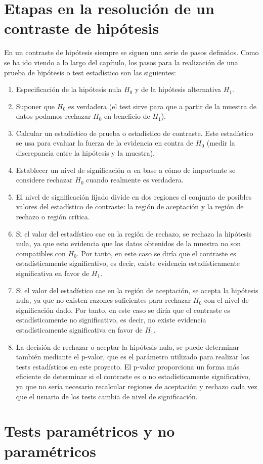\section{Etapas en la resolución de un contraste de hipótesis}
En un contraste de hipótesis siempre se siguen una serie de pasos definidos. Como se ha ido viendo a lo largo
del capítulo, los pasos para la realización de una prueba de hipótesis o test estadístico son las siguientes:
\begin{enumerate}
\item Especificación de la hipótesis nula $H_0$ y de la hipótesis alternativa $H_1$.
\item Suponer que $H_0$ es verdadera (el test sirve para que a partir de la muestra de datos podamos rechazar
$H_0$ en beneficio de $H_1$).
\item Calcular un estadístico de prueba o estadístico de contraste. Este estadístico se usa para evaluar la
fuerza de la evidencia en contra de $H_0$ (medir la discrepancia entre la hipótesis y la muestra).
\item Establecer un nivel de significación $\alpha$ en base a cómo de importante se considere rechazar $H_0$
cuando realmente es verdadera.
\item El nivel de significación fijado divide en dos regiones el conjunto de posibles valores del estadístico
de contraste: la región de aceptación y la región de rechazo o región crítica.
\item Si el valor del estadístico cae en la región de rechazo, se rechaza la hipótesis nula, ya que esto
evidencia que los datos obtenidos de la muestra no son compatibles con $H_0$. Por tanto, en este caso se diría
que el contraste es estadísticamente significativo, es decir, existe evidencia estadísticamente significativa en
favor de $H_1$.
\item Si el valor del estadístico cae en la región de aceptación, se acepta la hipótesis nula, ya que no existen
razones suficientes para rechazar $H_0$ con el nivel de significación dado. Por tanto, en este caso se diría
que el contraste es estadísticamente no significativo, es decir, no existe evidencia estadísticamente significativa
en favor de $H_1$.
\item La decisión de rechazar o aceptar la hipótesis nula, se puede determinar también mediante el p-valor,
que es el parámetro utilizado para realizar los tests estadísticos en este proyecto. El p-valor proporciona
un forma más eficiente de determinar si el contraste es o no estadísticamente significativo, ya que no sería
necesario recalcular regiones de aceptación y rechazo cada vez que el usuario de los tests cambia de nivel de
significación.
\end{enumerate}


\section{Tests paramétricos y no paramétricos}
